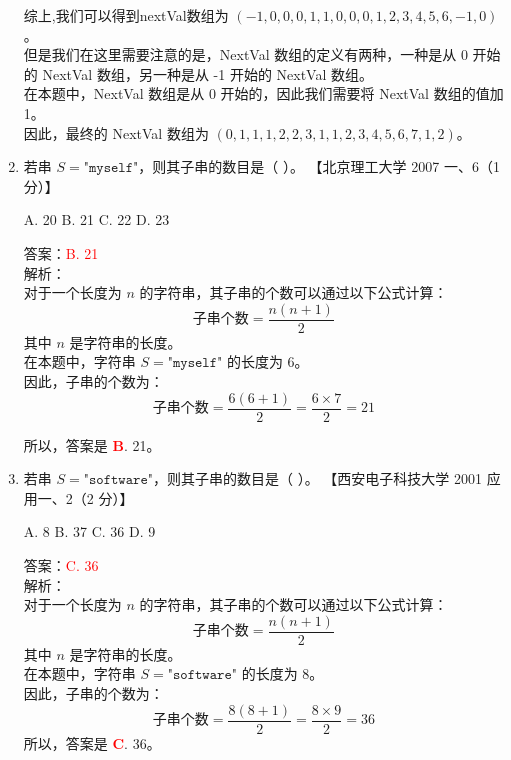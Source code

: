 \documentclass[lang=cn,newtx,10pt,scheme=chinese]{../../../elegantbook}
\begin{document}
\begin{enumerate}
    综上,我们可以得到nextVal数组为 $(-1,0,0,0,1,1,0,0,0,1,2,3,4,5,6,-1,0)$。\\
    但是我们在这里需要注意的是，NextVal 数组的定义有两种，一种是从 0 开始的 NextVal 数组，另一种是从 -1 开始的 NextVal 数组。\\
    在本题中，NextVal 数组是从 0 开始的，因此我们需要将 NextVal 数组的值加 1。\\
    因此，最终的 NextVal 数组为 $(0,1,1,1,2,2,3,1,1,2,3,4,5,6,7,1,2)$。\\

    \item 若串 $S = \texttt{"myself"}$，则其子串的数目是（ ）。  
    【北京理工大学 2007 一、6（1 分）】  

    A. 20 \quad B. 21 \quad C. 22 \quad D. 23  

    
    答案：\textcolor{red}{B. 21}\\
    解析：\\
    对于一个长度为 $n$ 的字符串，其子串的个数可以通过以下公式计算：\\
    \[
    \text{子串个数} = \frac{n(n+1)}{2}
    \]
    其中 $n$ 是字符串的长度。\\
    在本题中，字符串 $S = \texttt{"myself"}$ 的长度为 6。\\
    因此，子串的个数为：\\
    \[
        \text{子串个数} = \frac{6(6+1)}{2} = \frac{6 \times 7}{2} = 21
    \]

    所以，答案是 \textbf{\textcolor{red}{B}}. 21。\\

    \item 若串 $S = \texttt{"software"}$，则其子串的数目是（ ）。  
    【西安电子科技大学 2001 应用一、2（2 分）】  

    A. 8 \quad B. 37 \quad C. 36 \quad D. 9  

    答案：\textcolor{red}{C. 36}\\
    解析：\\
    对于一个长度为 $n$ 的字符串，其子串的个数可以通过以下公式计算：\\
    \[
    \text{子串个数} = \frac{n(n+1)}{2}
    \]
    其中 $n$ 是字符串的长度。\\
    在本题中，字符串 $S = \texttt{"software"}$ 的长度为 8。\\
    因此，子串的个数为：\\
    \[
        \text{子串个数} = \frac{8(8+1)}{2} = \frac{8 \times 9}{2} = 36
    \]
    所以，答案是 \textbf{\textcolor{red}{C}}. 36。\\


\end{enumerate}
\end{document}
